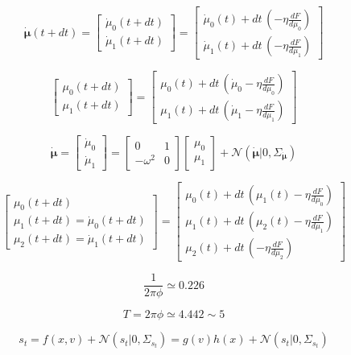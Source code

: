 \documentclass[a4paper, 10pt]{article}
\begin{document}
\begin{equation}
\dot{\bm \mu}(t+dt) = \left[ \begin{matrix} \dot{\mu}_0(t+dt) \\ \dot{\mu}_1(t+dt) \end{matrix} \right] = 
	\left[ \begin{matrix} \dot{\mu}_0(t) + dt \, (- \eta \frac{dF}{d\mu_0}) \\
						  \dot{\mu}_1(t) + dt \, (- \eta \frac{dF}{d\mu_1})
	\end{matrix} \right]
\end{equation}

\begin{equation}
\left[ \begin{matrix} \mu_0(t+dt) \\ \mu_1(t+dt) \end{matrix} \right] = 
	\left[ \begin{matrix} \mu_0(t) + dt \, (\dot{\mu}_0 - \eta \frac{dF}{d\mu_0}) \\
						  \mu_1(t) + dt \, (\dot{\mu}_1 - \eta \frac{dF}{d\mu_1})
	\end{matrix} \right]
\end{equation}

\begin{equation}
\dot{\bm \mu} = \left[ \begin{matrix} \dot{\mu}_0 \\ \dot{\mu}_1 \end{matrix} \right] = \left[ \begin{matrix} 0 & 1 \\ -\omega^2 & 0 \end{matrix} \right]  \left[ \begin{matrix} \mu_0 \\ \mu_1 \end{matrix} \right] + \mathcal{N}(\dot{\bm \mu}|0,\Sigma_{\dot{\bm \mu}})
\end{equation}

\begin{equation}
\left[ \begin{matrix} \mu_0(t+dt) \\ \mu_1(t+dt)=\dot{\mu}_0(t+dt) \\ \mu_2(t+dt)=\dot{\mu}_1(t+dt) \end{matrix} \right] = 
	\left[ \begin{matrix} \mu_0(t) + dt \, (\mu_1(t) - \eta \frac{dF}{d\mu_0}) \\
						  \mu_1(t) + dt \, (\mu_2(t) - \eta \frac{dF}{d\mu_1}) \\
						  \mu_2(t) + dt \, ( - \eta	\frac{dF}{d\mu_2})
	\end{matrix} \right]
\end{equation}

\begin{equation}
\frac{1}{2 \pi \phi} \simeq 0.226
\end{equation}


\begin{equation}
T = 2 \pi \phi \simeq 4.442 \sim 5
\end{equation}


\begin{equation}
s_t = f(x,v) + \mathcal{N}(s_t|0, \Sigma_{s_t}) = g(v) h(x) + \mathcal{N}(s_t|0, \Sigma_{s_t}) 
\end{equation}




\newpage

\printbibliography
\end{document}
